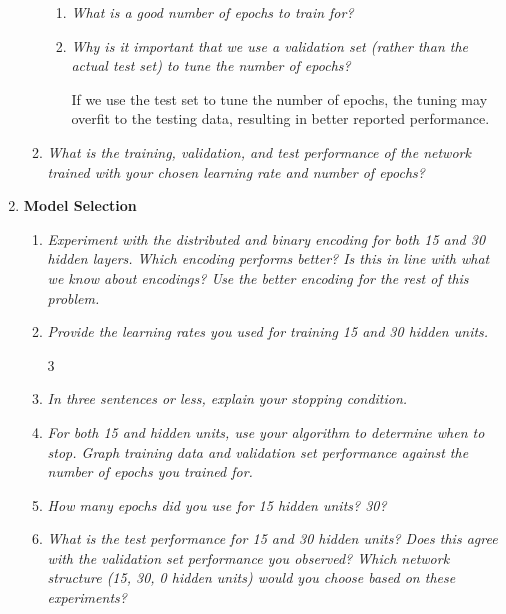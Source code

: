 \documentclass{article}
\begin{document}
\begin{enumerate}
\begin{enumerate}
\begin{enumerate}
      \item \textit{What is a good number of epochs to train for?}


      \item \textit{Why is it important that we use a validation set
        (rather than the actual test set) to tune the number of
        epochs?}

        If we use the test set to tune the number of epochs, the tuning may 
        overfit to the testing data, resulting in better reported performance. 

      \end{enumerate}
    \item \textit{What is the training, validation, and test
      performance of the network trained with your chosen learning
      rate and number of epochs?}

    \end{enumerate}

  \item \textbf{Model Selection}
    \begin{enumerate}
    \item \textit{Experiment with the distributed and binary encoding
      for both 15 and 30 hidden layers. Which encoding performs
      better? Is this in line with what we know about encodings? Use
      the better encoding for the rest of this problem.}

    \item \textit{Provide the learning rates you used for training 15
      and 30 hidden units.}

      \setcounter{enumii}3

    \item \textit{In three sentences or less, explain your stopping
      condition.}

    \item \textit{For both 15 and hidden units, use your algorithm to
      determine when to stop.  Graph training data and validation set
      performance against the number of epochs you trained for.}

    \item \textit{How many epochs did you use for 15 hidden units?
      30?}

    \item \textit{What is the test performance for 15 and 30 hidden
      units? Does this agree with the validation set performance you
      observed? Which network structure (15, 30, 0 hidden units) would
      you choose based on these experiments?}

    \end{enumerate}


  \end{enumerate}
\end{document}
